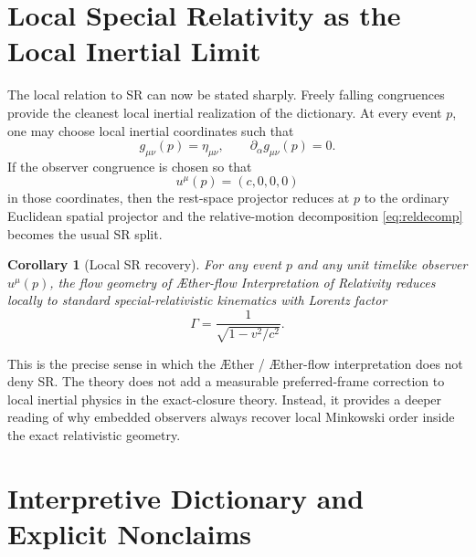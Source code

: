 \documentclass[11pt]{article}
\newcommand{\Aether}{\AE{}ther}
\newcommand{\Aflow}{\AE{}ther-flow}
\newcommand{\TheoryName}{\Aflow{} Interpretation of Relativity}
\newtheorem{corollary}{Corollary}
\begin{document}
\section{Local Special Relativity as the Local Inertial Limit}

The local relation to SR can now be stated sharply. Freely falling congruences provide the cleanest local inertial realization of the dictionary. At every event \(p\), one may choose local inertial coordinates such that
\begin{equation}
g_{\mu\nu}(p)=\eta_{\mu\nu},
\qquad
\partial_\alpha g_{\mu\nu}(p)=0.
\label{eq:localinertial}
\end{equation}
If the observer congruence is chosen so that
\begin{equation}
u^\mu(p)=(c,0,0,0)
\label{eq:localobserver}
\end{equation}
in those coordinates, then the rest-space projector reduces at \(p\) to the ordinary Euclidean spatial projector and the relative-motion decomposition \eqref{eq:reldecomp} becomes the usual SR split.

\begin{corollary}[Local SR recovery]
For any event \(p\) and any unit timelike observer \(u^\mu(p)\), the flow geometry of \TheoryName{} reduces locally to standard special-relativistic kinematics with Lorentz factor
\begin{equation}
\Gamma=\frac{1}{\sqrt{1-v^2/c^2}}.
\label{eq:localsr}
\end{equation}
\end{corollary}

This is the precise sense in which the \Aether{} / \Aflow{} interpretation does not deny SR. The theory does not add a measurable preferred-frame correction to local inertial physics in the exact-closure theory. Instead, it provides a deeper reading of why embedded observers always recover local Minkowski order inside the exact relativistic geometry.

\section{Interpretive Dictionary and Explicit Nonclaims}
\end{document}
